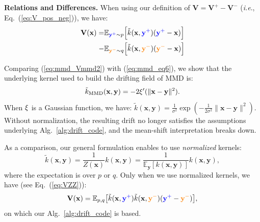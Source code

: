 \documentclass{article}
\newcommand{\vv}[1]{\mathbf{#1}}
\newcommand{\x}{\vv{x}}
\newcommand{\y}{\vv{y}}
\newcommand{\V}{\vv{V}}
\newcommand{\yp}{{\textcolor{blue}{\vv{y}^{+}}}}
\newcommand{\yn}{{\textcolor{orange}{\vv{y}^{-}}}}
\renewcommand{\paragraph}[1]{\vspace{.05em}\noindent\textbf{#1}}
\def\onedot{.}
\def\ie{\emph{i.e}\onedot} \def\Ie{\emph{I.e}\onedot}
\theoremstyle{plain}
\theoremstyle{definition}
\theoremstyle{remark}
\begin{document}
\paragraph{Relations and Differences.}
When using our definition of $\V = \V^{+} - \V^{-}$ (\ie, Eq.~(\ref{eq:V_pos_neg})), we have:
\begin{equation}
\begin{aligned}
\label{eq:mmd_eq6}
\V(\x)
= &
\mathbb{E}_{\yp{\sim}p} \Big[
\tilde{k}(\x, \yp)(\yp - \x)
\Big] \\
- &
\mathbb{E}_{\yn{\sim}q} \Big[
\tilde{k}(\x, \yn)(\yn - \x)
\Big]
\end{aligned}
\end{equation}

Comparing (\ref{eq:mmd_Vmmd2}) with (\ref{eq:mmd_eq6}), we show that the underlying kernel used to build the drifting field of MMD is:
\begin{equation}
\label{eq:mmd_eq7}
\tilde{k}_\text{MMD}(\x, \y)=-2\kk'(\|\x - \y\|^2).
\end{equation}
When $\xi$ is a Gaussian function, we have: $\tilde{k}(\x, \y)=\frac{1}{\sigma^2}\exp (-\frac{1}{2\sigma^2} \|\x{-}\y\|^2)$.
Without normalization, the resulting drift no longer satisfies the assumptions underlying Alg.~\ref{alg:drift_code}, and the mean-shift interpretation breaks down.

As a comparison, our general formulation enables to use \textit{normalized} kernels:
\begin{equation}
\tilde{k}(\x, \y)=\frac{1}{Z(\x)}k(\x, \y)=\frac{1}{\mathbb{E}_\y[k(\x, \y)]}k(\x, \y),
\end{equation}
where the expectation is over $p$ or $q$.
Only when we use normalized kernels, we have (see Eq.~(\ref{eq:VZZ})):
\begin{equation}
\V(\x)
= {\mathbb{E}_{p,q}\!\left[\tilde{k}(\x,\yp)\tilde{k}(\x,\yn)(\yp - \yn)\right]},
\end{equation}
on which our Alg.~\ref{alg:drift_code} is based.
\end{document}
